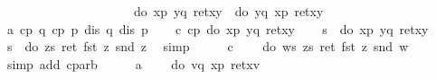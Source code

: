\begin{isabellebody}
\ \ \ \ \ \ \ \ \ \ \ \ \ \ \ \ \ \ \ \ {\isasymLongrightarrow}\ do\ {\isacharbraceleft}x{\isasymleftarrow}p{\isacharsemicolon}\ y{\isasymleftarrow}q{\isacharsemicolon}\ ret{\isacharparenleft}x{\isacharcomma}y{\isacharparenright}{\isacharbraceright}\ {\isacharequal}\ do\ {\isacharbraceleft}y{\isasymleftarrow}q{\isacharsemicolon}\ x{\isasymleftarrow}p{\isacharsemicolon}\ ret{\isacharparenleft}x{\isacharcomma}y{\isacharparenright}{\isacharbraceright}{\isachardoublequote}\isanewline
\isamarkupfalse%
\ {\isacharminus}\isanewline
\ \ \isamarkupfalse%
\ a{\isacharcolon}\ {\isachardoublequote}cp\ q{\isachardoublequote}\ {\isachardoublequote}cp\ p{\isachardoublequote}\ {\isachardoublequote}dis\ q{\isachardoublequote}\ {\isachardoublequote}dis\ p{\isachardoublequote}\isanewline
\ \ \isamarkupfalse%
\ c{\isacharcolon}\ {\isachardoublequote}cp\ {\isacharparenleft}do\ {\isacharbraceleft}x{\isasymleftarrow}p{\isacharsemicolon}\ y{\isasymleftarrow}q{\isacharsemicolon}\ ret{\isacharparenleft}x{\isacharcomma}y{\isacharparenright}{\isacharbraceright}{\isacharparenright}{\isachardoublequote}\isanewline
\ \ \isamarkupfalse%
\ {\isacharquery}s\ {\isacharequal}\ {\isachardoublequote}do\ {\isacharbraceleft}x{\isasymleftarrow}p{\isacharsemicolon}\ y{\isasymleftarrow}q{\isacharsemicolon}\ ret{\isacharparenleft}x{\isacharcomma}y{\isacharparenright}{\isacharbraceright}{\isachardoublequote}\isanewline
\ \ \isamarkupfalse%
\ {\isachardoublequote}{\isacharquery}s\ {\isacharequal}\ do\ {\isacharbraceleft}z{\isasymleftarrow}{\isacharquery}s{\isacharsemicolon}\ ret\ {\isacharparenleft}fst\ z{\isacharcomma}\ snd\ z{\isacharparenright}{\isacharbraceright}{\isachardoublequote}\ \isamarkupfalse%
\ simp\isanewline
\ \ \isamarkupfalse%
\ \isamarkupfalse%
\ c\ \isamarkupfalse%
\ {\isachardoublequote}{\isasymdots}\ {\isacharequal}\ do\ {\isacharbraceleft}w{\isasymleftarrow}{\isacharquery}s{\isacharsemicolon}\ z{\isasymleftarrow}{\isacharquery}s{\isacharsemicolon}\ ret\ {\isacharparenleft}fst\ z{\isacharcomma}\ snd\ w{\isacharparenright}{\isacharbraceright}{\isachardoublequote}\ \isamarkupfalse%
\ {\isacharparenleft}simp\ add{\isacharcolon}\ cp{\isacharunderscore}arb{\isacharparenright}\isanewline
\ \ \isamarkupfalse%
\ \isamarkupfalse%
\ a\ \isamarkupfalse%
\ {\isachardoublequote}{\isasymdots}\ {\isacharequal}\ do\ {\isacharbraceleft}v{\isasymleftarrow}q{\isacharsemicolon}\ x{\isasymleftarrow}p{\isacharsemicolon}\ ret{\isacharparenleft}x{\isacharcomma}v{\isacharparenright}{\isacharbraceright}{\isachardoublequote}\ \isamarkupfalse%

\end{isabellebody}
